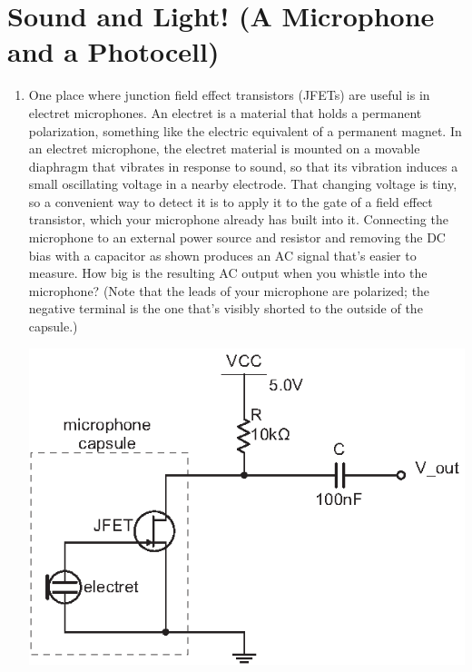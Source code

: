 \section{Sound and Light! (A Microphone and a Photocell)}
\label{lab_microphone_photocell}


\bigskip

\begin{enumerate}[wide]

\item One place where junction field effect transistors (JFETs) are useful is in electret microphones.  An electret is a material that holds a permanent polarization, something like the electric equivalent of a permanent magnet.  In an electret microphone, the electret material is mounted on a movable diaphragm that vibrates in response to sound, so that its vibration induces a small oscillating voltage in a nearby electrode.  That changing voltage is tiny, so a convenient way to detect it is to apply it to the gate of a field effect transistor, which your microphone already has built into it.  Connecting the microphone to an external power source and resistor and removing the DC bias with a capacitor as shown produces an AC signal that's easier to measure.  How big is the resulting AC output when you whistle into the microphone?   (Note that the leads of your microphone are polarized; the negative terminal is the one that's visibly shorted to the outside of the capsule.)  \label{part_microphone}
\begin{center}
\includegraphics{microphone_photocell/microphone_circuit.eps}
\end{center}


\end{enumerate}
